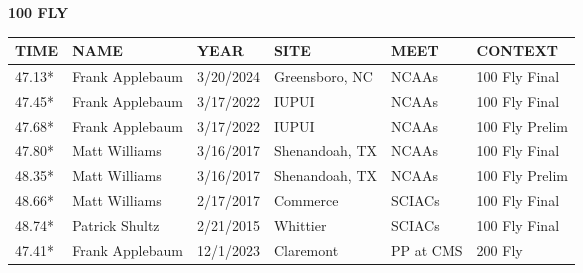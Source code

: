 \begin{minipage}[t]{0.48\textwidth}
\centering
\textbf{100 FLY}\\[0.05cm]
\begin{tabular}{@{}p{1.8cm}p{2.8cm}p{1.2cm}p{1.4cm}p{1.4cm}p{2.0cm}@{}}
\hline
\textbf{TIME} & \textbf{NAME} & \textbf{YEAR} & \textbf{SITE} & \textbf{MEET} & \textbf{CONTEXT} \\
\hline
47.13* & Frank Applebaum & 3/20/2024 & Greensboro, NC & NCAAs & 100 Fly Final \\
47.45* & Frank Applebaum & 3/17/2022 & IUPUI & NCAAs & 100 Fly Final \\
47.68* & Frank Applebaum & 3/17/2022 & IUPUI & NCAAs & 100 Fly Prelim \\
47.80* & Matt Williams & 3/16/2017 & Shenandoah, TX & NCAAs & 100 Fly Final \\
48.35* & Matt Williams & 3/16/2017 & Shenandoah, TX & NCAAs & 100 Fly Prelim \\
48.66* & Matt Williams & 2/17/2017 & Commerce & SCIACs & 100 Fly Final \\
48.74* & Patrick Shultz & 2/21/2015 & Whittier & SCIACs & 100 Fly Final \\
47.41* & Frank Applebaum & 12/1/2023 & Claremont & PP at CMS & 200 Fly \\
\hline
\end{tabular}
\end{minipage}\hfill
